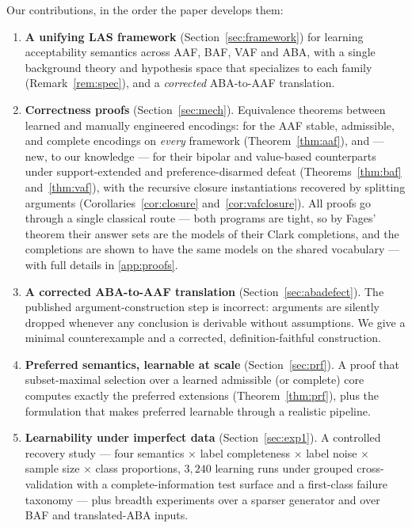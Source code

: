 \documentclass[review,12pt]{elsarticle}
\theoremstyle{definition}
\theoremstyle{remark}
\begin{document}
\noindent Our contributions, in the order the paper develops them:

\begin{enumerate}[label=\textbf{C\arabic*.},leftmargin=2.5em,itemsep=2pt]
\item \textbf{A unifying LAS framework} (Section~\ref{sec:framework}) for
learning acceptability semantics across AAF, BAF, VAF and ABA, with a single
background theory and hypothesis space that specializes to each family
(Remark~\ref{rem:spec}), and a \emph{corrected} ABA-to-AAF translation.
\item \textbf{Correctness proofs} (Section~\ref{sec:mech}). Equivalence
theorems between learned and manually engineered encodings: for the AAF
stable, admissible, and complete encodings on \emph{every} framework
(Theorem~\ref{thm:aaf}), and --- new, to our knowledge --- for their bipolar
and value-based counterparts under support-extended and preference-disarmed
defeat (Theorems~\ref{thm:baf} and~\ref{thm:vaf}), with the recursive
closure instantiations recovered by splitting arguments
(Corollaries~\ref{cor:closure} and~\ref{cor:vafclosure}). All proofs go through a single classical route
--- both programs are tight, so by Fages' theorem their answer sets are the
models of their Clark completions, and the completions are shown to have
the same models on the shared vocabulary --- with full details in
\ref{app:proofs}.
\item \textbf{A corrected ABA-to-AAF translation} (Section~\ref{sec:abadefect}).
The published argument-construction step is incorrect: arguments are silently
dropped whenever any conclusion is derivable without assumptions. We give a
minimal counterexample and a corrected, definition-faithful construction.
\item \textbf{Preferred semantics, learnable at scale}
(Section~\ref{sec:prf}). A proof that subset-maximal selection over a learned
admissible (or complete) core computes exactly the preferred extensions
(Theorem~\ref{thm:prf}), plus the formulation that makes preferred learnable
through a realistic pipeline.
\item \textbf{Learnability under imperfect data} (Section~\ref{sec:exp1}). A
controlled recovery study --- four semantics $\times$ label completeness
$\times$ label noise $\times$ sample size $\times$ class proportions, $3{,}240$
learning runs under grouped cross-validation with a complete-information test
surface and a first-class failure taxonomy --- plus breadth experiments over a
sparser generator and over BAF and translated-ABA inputs.

\end{enumerate}
\end{document}
